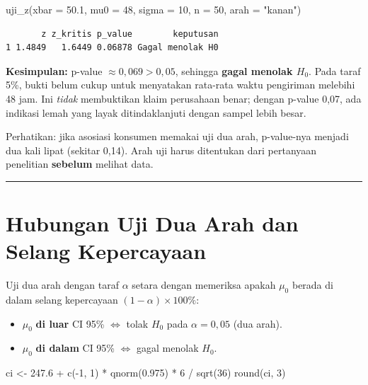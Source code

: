 \documentclass[
  indonesian,
  letterpaper,
]{book}
\newenvironment{Shaded}{\begin{snugshade}}{\end{snugshade}}
\newcommand{\AttributeTok}[1]{\textcolor[rgb]{0.40,0.45,0.13}{#1}}
\newcommand{\DecValTok}[1]{\textcolor[rgb]{0.68,0.00,0.00}{#1}}
\newcommand{\FloatTok}[1]{\textcolor[rgb]{0.68,0.00,0.00}{#1}}
\newcommand{\FunctionTok}[1]{\textcolor[rgb]{0.28,0.35,0.67}{#1}}
\newcommand{\NormalTok}[1]{\textcolor[rgb]{0.00,0.23,0.31}{#1}}
\newcommand{\OtherTok}[1]{\textcolor[rgb]{0.00,0.23,0.31}{#1}}
\newcommand{\SpecialCharTok}[1]{\textcolor[rgb]{0.37,0.37,0.37}{#1}}
\newcommand{\StringTok}[1]{\textcolor[rgb]{0.13,0.47,0.30}{#1}}
\providecommand{\tightlist}{%
  \setlength{\itemsep}{0pt}\setlength{\parskip}{0pt}}
\begin{document}
\begin{Shaded}
\begin{Highlighting}[]
\FunctionTok{uji\_z}\NormalTok{(}\AttributeTok{xbar =} \FloatTok{50.1}\NormalTok{, }\AttributeTok{mu0 =} \DecValTok{48}\NormalTok{, }\AttributeTok{sigma =} \DecValTok{10}\NormalTok{, }\AttributeTok{n =} \DecValTok{50}\NormalTok{, }\AttributeTok{arah =} \StringTok{"kanan"}\NormalTok{)}
\end{Highlighting}
\end{Shaded}

\begin{verbatim}
       z z_kritis p_value        keputusan
1 1.4849   1.6449 0.06878 Gagal menolak H0
\end{verbatim}

\textbf{Kesimpulan:} p-value \(\approx 0{,}069 > 0{,}05\), sehingga
\textbf{gagal menolak \(H_0\)}. Pada taraf 5\%, bukti belum cukup untuk
menyatakan rata-rata waktu pengiriman melebihi 48 jam. Ini \emph{tidak}
membuktikan klaim perusahaan benar; dengan p-value 0,07, ada indikasi
lemah yang layak ditindaklanjuti dengan sampel lebih besar.

Perhatikan: jika asosiasi konsumen memakai uji dua arah, p-value-nya
menjadi dua kali lipat (sekitar 0,14). Arah uji harus ditentukan dari
pertanyaan penelitian \textbf{sebelum} melihat data.

\begin{center}\rule{0.5\linewidth}{0.5pt}\end{center}


\chapter{Hubungan Uji Dua Arah dan Selang
Kepercayaan}\label{hubungan-uji-dua-arah-dan-selang-kepercayaan}

Uji dua arah dengan taraf \(\alpha\) setara dengan memeriksa apakah
\(\mu_0\) berada di dalam selang kepercayaan
\((1-\alpha) \times 100\%\):

\begin{itemize}
\tightlist
\item
  \(\mu_0\) \textbf{di luar} CI 95\% \(\iff\) tolak \(H_0\) pada
  \(\alpha = 0{,}05\) (dua arah).
\item
  \(\mu_0\) \textbf{di dalam} CI 95\% \(\iff\) gagal menolak \(H_0\).
\end{itemize}

\begin{Shaded}
\begin{Highlighting}[]
\NormalTok{ci }\OtherTok{\textless{}{-}} \FloatTok{247.6} \SpecialCharTok{+} \FunctionTok{c}\NormalTok{(}\SpecialCharTok{{-}}\DecValTok{1}\NormalTok{, }\DecValTok{1}\NormalTok{) }\SpecialCharTok{*} \FunctionTok{qnorm}\NormalTok{(}\FloatTok{0.975}\NormalTok{) }\SpecialCharTok{*} \DecValTok{6} \SpecialCharTok{/} \FunctionTok{sqrt}\NormalTok{(}\DecValTok{36}\NormalTok{)}
\FunctionTok{round}\NormalTok{(ci, }\DecValTok{3}\NormalTok{)}
\end{Highlighting}
\end{Shaded}
\end{document}
